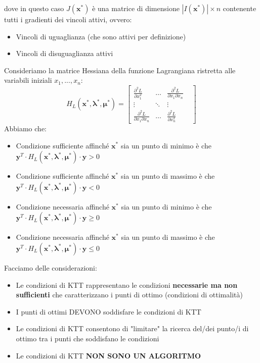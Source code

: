 \documentclass[12pt]{article}
\begin{document}
dove in questo caso $J(\boldsymbol{x}^*)$ è una matrice di dimensione $|I(\boldsymbol{x}^*)| \times n$ contenente tutti i gradienti dei vincoli attivi, ovvero:
\begin{itemize}
    \item Vincoli di uguaglianza (che sono attivi per definizione)
    \item Vincoli di disuguaglianza attivi
\end{itemize}
Consideriamo la matrice Hessiana della funzione Lagrangiana ristretta alle variabili iniziali $x_1,...,x_n$:
$$H_L(\boldsymbol{x}^*, \boldsymbol{\lambda}^*, \boldsymbol{\mu}^*) = \begin{bmatrix}
    \frac{\partial^2 L}{\partial x_1^2} & \dots & \frac{\partial^2 L}{\partial x_1 \partial x_n} \\
    \vdots & \ddots & \vdots & \\
    \frac{\partial^2 L}{\partial x_1 \partial x_n} & \dots & \frac{\partial^2 L}{\partial x_n^2}
\end{bmatrix}$$
Abbiamo che:
\begin{itemize}
    \item Condizione sufficiente affinché $\boldsymbol{x}^*$ sia un punto di minimo è che \newline $\boldsymbol{y}^T \cdot H_L(\boldsymbol{x}^*, \boldsymbol{\lambda}^*, \boldsymbol{\mu}^*) \cdot \boldsymbol{y} > 0$
    \item Condizione sufficiente affinché $\boldsymbol{x}^*$ sia un punto di massimo è che \newline $\boldsymbol{y}^T \cdot H_L(\boldsymbol{x}^*, \boldsymbol{\lambda}^*, \boldsymbol{\mu}^*) \cdot \boldsymbol{y} < 0$
    \item Condizione necessaria affinché $\boldsymbol{x}^*$ sia un punto di minimo è che \newline $\boldsymbol{y}^T \cdot H_L(\boldsymbol{x}^*, \boldsymbol{\lambda}^*, \boldsymbol{\mu}^*) \cdot \boldsymbol{y} \geq 0$
    \item Condizione necessaria affinché $\boldsymbol{x}^*$ sia un punto di massimo è che \newline $\boldsymbol{y}^T \cdot H_L(\boldsymbol{x}^*, \boldsymbol{\lambda}^*, \boldsymbol{\mu}^*) \cdot \boldsymbol{y} \leq 0$
\end{itemize}
Facciamo delle considerazioni:
\begin{itemize}
    \item Le condizioni di KTT rappresentano le condizioni \textbf{necessarie ma non sufficienti} che caratterizzano i punti di ottimo (condizioni di ottimalità)
    \item I punti di ottimi DEVONO soddisfare le condizioni di KTT
    \item Le condizioni di KTT consentono di "limitare" la ricerca del/dei punto/i di ottimo tra i punti che soddisfano le condizioni
    \item Le condizioni di KTT \textbf{NON SONO UN ALGORITMO}
\end{itemize}
\end{document}
